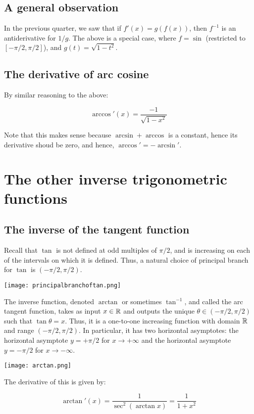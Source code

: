 \documentclass{amsart}
\begin{document}
\subsection{A general observation}

In the previous quarter, we saw that if $f'(x) = g(f(x))$, then
$f^{-1}$ is an antiderivative for $1/g$. The above is a special case,
where $f = \sin$ (restricted to $[-\pi/2,\pi/2]$), and $g(t) = \sqrt{1
- t^2}$.

\subsection{The derivative of arc cosine}

By similar reasoning to the above:

$$\arccos'(x) = \frac{-1}{\sqrt{1 - x^2}}$$

Note that this makes sense because $\arcsin + \arccos$ is a constant,
hence its derivative shoud be zero, and hence, $\arccos' = -\arcsin'$.

\section{The other inverse trigonometric functions}

\subsection{The inverse of the tangent function}

Recall that $\tan$ is not defined at odd multiples of $\pi/2$, and is
increasing on each of the intervals on which it is defined. Thus, a
natural choice of principal branch for $\tan$ is
$(-\pi/2,\pi/2)$.

\texttt{[image: principalbranchoftan.png]}

The inverse function, denoted $\arctan$ or sometimes $\tan^{-1}$, and
called the arc tangent function, takes as input $x \in \mathbb{R}$ and outputs
the unique $\theta \in (-\pi/2,\pi/2)$ such that $\tan \theta =
x$. Thus, it is a one-to-one increasing function with domain $\mathbb{R}$ and
range $(-\pi/2,\pi/2)$. In particular, it has two horizontal
asymptotes: the horizontal asymptote $y = +\pi/2$ for $x \to +\infty$
and the horizontal asymptote $y = -\pi/2$ for $x \to -\infty$.

\texttt{[image: arctan.png]}

The derivative of this is given by:

$$\arctan'(x) = \frac{1}{\sec^2(\arctan x)} = \frac{1}{1 + x^2}$$
\end{document}
